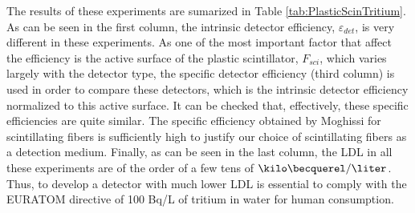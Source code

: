 
The results of these experiments are sumarized in Table \ref{tab:PlasticScinTritium}. As can be seen in the first column, the intrinsic detector efficiency, $\varepsilon_{det}$, is very different in these experiments. As one of the most important factor that affect the efficiency is the active surface of the plastic scintillator, $F_{sci}$, which varies largely with the detector type, the specific detector efficiency (third column) is used in order to compare these detectors, which is the intrinsic detector efficiency normalized to this active surface. It can be checked that, effectively, these specific efficiencies are quite similar. The specific efficiency obtained by Moghissi for scintillating fibers is sufficiently high to justify our choice of scintillating fibers as a detection medium. Finally, as can be seen in the last column, the LDL in all these experiments are of the order of a few tens of $\kilo\becquerel/\liter$. Thus, to develop a detector with much lower LDL is essential to comply with the EURATOM directive of 100 Bq/L of tritium in water for human consumption.